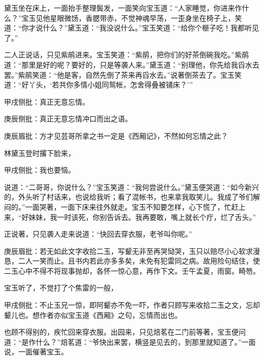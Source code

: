 \begin{parag}
    黛玉坐在床上，一面抬手整理鬓发，一面笑向宝玉道：“人家睡觉，你进来作什么？”宝玉见他星眼微饧，香腮带赤，不觉神魂早荡，一歪身坐在椅子上，笑道：“你才说什么？”黛玉道：“我没说什么。”宝玉笑道：“给你个榧子吃！我都听见了。”
\end{parag}


\begin{parag}
    二人正说话，只见紫鹃进来。宝玉笑道：“紫鹃，把你们的好茶倒碗我吃。”紫鹃道：“那里是好的呢？要好的，只是等袭人来。”黛玉道：“别理他，你先给我舀水去罢。”紫鹃笑道：“他是客，自然先倒了茶来再舀水去。”说著倒茶去了。宝玉笑道：“好丫头，‘若共你多情小姐同鸳帐，怎舍得叠被铺床？’”\begin{note}甲戌侧批：真正无意忘情。\end{note}\begin{note}庚辰侧批：真正无意忘情冲口而出之语。\end{note}\begin{note}庚辰眉批：方才见芸哥所拿之书一定是《西厢记》，不然如何忘情之此？\end{note}林黛玉登时撂下脸来，\begin{note}甲戌侧批：我也要恼。\end{note}说道：“二哥哥，你说什么？”宝玉笑道：“我何尝说什么。”黛玉便哭道：“如今新兴的，外头听了村话来，也说给我听；看了混帐书，也来拿我取笑儿。我成了爷们解闷的。”一面哭著，一面下床来往外就走。宝玉不知要怎样，心下慌了，忙赶上来，“好妹妹，我一时该死，你别告诉去。我再要敢，嘴上就长个疔，烂了舌头。”
\end{parag}


\begin{parag}
    正说著，只见袭人走来说道：“快回去穿衣服，老爷叫你呢。”\begin{note}庚辰眉批：若无如此文字收拾二玉，写颦无非至再哭恸哭，玉只以赔尽小心软求漫恳，二人一笑而止。且书内若此亦多多矣，未免有犯雷同之病。故用险句结住，使二玉心中不得不将现事抛却，各怀一惊心意，再作下文。壬午孟夏，雨窗。畸笏。\end{note}宝玉听了，不觉打了个焦雷的一般，\begin{note}甲戌侧批：不止玉兄一惊，即阿颦亦不免一吓，作者只顾写来收拾二玉之文，忘却颦儿也。想作者亦似宝玉道《西厢》之句，忘情而出也。\end{note}也顾不得别的，疾忙回来穿衣服。出园来，只见焙茗在二门前等著，宝玉便问道：“是作什么？”焙茗道：“爷快出来罢，横竖是见去的，到那里就知道了。”一面说，一面催著宝玉。
\end{parag}


